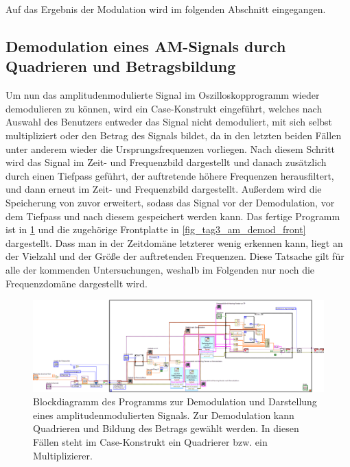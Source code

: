 \documentclass[
a4paper,
12pt,
pagesize,
ngerman
]{scrartcl}
\begin{document}
	Auf das Ergebnis der Modulation wird im folgenden Abschnitt eingegangen.
	
	
	\subsection{Demodulation eines AM-Signals durch Quadrieren und Betragsbildung} \label{DemodulationAM}
	Um nun das amplitudenmodulierte Signal im Oszilloskopprogramm wieder demodulieren zu können, wird ein Case-Konstrukt eingeführt, welches nach Auswahl des Benutzers entweder das Signal nicht demoduliert, mit sich selbst multipliziert oder den Betrag des Signals bildet, da in den letzten beiden Fällen unter anderem wieder die Ursprungsfrequenzen vorliegen.
	Nach diesem Schritt wird das Signal im Zeit- und Frequenzbild dargestellt und danach zusätzlich durch einen Tiefpass geführt, der auftretende höhere Frequenzen herausfiltert, und dann erneut im Zeit- und Frequenzbild dargestellt.
	Außerdem wird die Speicherung von zuvor erweitert, sodass das Signal vor der Demodulation, vor dem Tiefpass und nach diesem gespeichert werden kann.
	Das fertige Programm ist in \cref{fig_tag3_am_demod_block} und die zugehörige Frontplatte in \cref{fig_tag3_am_demod_front} dargestellt.
	Dass man in der Zeitdomäne letzterer wenig erkennen kann, liegt an der Vielzahl und der Größe der auftretenden Frequenzen.
	Diese Tatsache gilt für alle der kommenden Untersuchungen, weshalb im Folgenden nur noch die Frequenzdomäne dargestellt wird.
	

	\begin{figure}[H]  
		\includegraphics[width=1\textwidth]{EIRE2018Dateien/Tag3/modifizierterOszi/Oszilloskop__modifiziertd}
		\centering
		\caption{
			Blockdiagramm des Programms zur Demodulation und Darstellung eines amplitudenmodulierten Signals. Zur Demodulation kann Quadrieren und Bildung des Betrags gewählt werden. In diesen Fällen steht im Case-Konstrukt ein Quadrierer bzw. ein Multiplizierer.
		}
		\label{fig_tag3_am_demod_block}
		\centering
	\end{figure}
\end{document}
